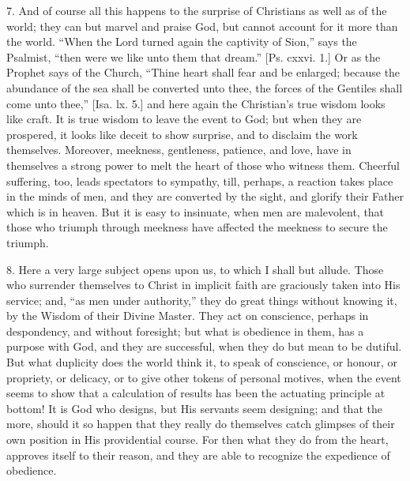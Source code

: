 7. And of course all this happens to the surprise of Christians as
well as of the world; they can but marvel and praise God, but cannot
account for it more than the world. ``When the Lord turned again
the captivity of Sion,'' says the Psalmist, ``then were we
like unto them that dream.'' [Ps. cxxvi. 1.] Or as the Prophet
says of the Church, ``Thine heart shall fear and be enlarged;
because the abundance of the sea shall be converted unto thee, the
forces of the Gentiles shall come unto thee,'' [Isa. lx. 5.] and
here again the Christian's true wisdom looks like craft. It is true
wisdom to leave the event to God; but when they are prospered, it
looks like deceit to show surprise, and to disclaim the work
themselves. Moreover, meekness, gentleness, patience, and love, have
in themselves a strong power to melt the heart of those who witness
them. Cheerful suffering, too, leads spectators to sympathy, till,
perhaps, a reaction takes place in the minds of men, and they are
converted by the sight, and glorify their Father which is in heaven.
But it is easy to insinuate, when men are malevolent, that those who
triumph through meekness have affected the meekness to secure the
triumph.

8. Here a very large subject opens upon us, to which I shall but
allude. Those who surrender themselves to Christ in implicit faith are
graciously taken into His service; and, ``as men under
authority,'' they do great things without knowing it, by the
Wisdom of their Divine Master. They act on conscience, perhaps in
despondency, and without foresight; but what is obedience in them, has
a purpose with God, and they are successful, when they do but mean to
be dutiful. But what duplicity does the world think it, to speak of
conscience, or honour, or propriety, or delicacy, or to give other
tokens of personal motives, when the event seems to show that a
calculation of results has been the actuating principle at bottom! It
is God who designs, but His servants seem designing; and that the
more, should it so happen that they really do themselves catch
glimpses of their own position in His providential course. For then
what they do from the heart, approves itself to their reason, and they
are able to recognize the expedience of obedience.

